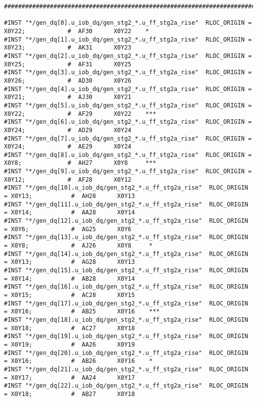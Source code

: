 \begin{verbatim}
################################################################################

#INST "*/gen_dq[0].u_iob_dq/gen_stg2_*.u_ff_stg2a_rise"  RLOC_ORIGIN = X0Y22;            #  AF30      X0Y22    *
#INST "*/gen_dq[1].u_iob_dq/gen_stg2_*.u_ff_stg2a_rise"  RLOC_ORIGIN = X0Y23;            #  AK31      X0Y23    
#INST "*/gen_dq[2].u_iob_dq/gen_stg2_*.u_ff_stg2a_rise"  RLOC_ORIGIN = X0Y25;            #  AF31      X0Y25    
#INST "*/gen_dq[3].u_iob_dq/gen_stg2_*.u_ff_stg2a_rise"  RLOC_ORIGIN = X0Y26;            #  AD30      X0Y26    
#INST "*/gen_dq[4].u_iob_dq/gen_stg2_*.u_ff_stg2a_rise"  RLOC_ORIGIN = X0Y21;            #  AJ30      X0Y21    
#INST "*/gen_dq[5].u_iob_dq/gen_stg2_*.u_ff_stg2a_rise"  RLOC_ORIGIN = X0Y22;            #  AF29      X0Y22    ***
#INST "*/gen_dq[6].u_iob_dq/gen_stg2_*.u_ff_stg2a_rise"  RLOC_ORIGIN = X0Y24;            #  AD29      X0Y24    
#INST "*/gen_dq[7].u_iob_dq/gen_stg2_*.u_ff_stg2a_rise"  RLOC_ORIGIN = X0Y24;            #  AE29      X0Y24    
#INST "*/gen_dq[8].u_iob_dq/gen_stg2_*.u_ff_stg2a_rise"  RLOC_ORIGIN = X0Y8;             #  AH27      X0Y8     ***
#INST "*/gen_dq[9].u_iob_dq/gen_stg2_*.u_ff_stg2a_rise"  RLOC_ORIGIN = X0Y12;            #  AF28      X0Y12    
#INST "*/gen_dq[10].u_iob_dq/gen_stg2_*.u_ff_stg2a_rise"  RLOC_ORIGIN = X0Y13;           #  AH28      X0Y13    
#INST "*/gen_dq[11].u_iob_dq/gen_stg2_*.u_ff_stg2a_rise"  RLOC_ORIGIN = X0Y14;           #  AA28      X0Y14    
#INST "*/gen_dq[12].u_iob_dq/gen_stg2_*.u_ff_stg2a_rise"  RLOC_ORIGIN = X0Y6;            #  AG25      X0Y6     
#INST "*/gen_dq[13].u_iob_dq/gen_stg2_*.u_ff_stg2a_rise"  RLOC_ORIGIN = X0Y8;            #  AJ26      X0Y8     *
#INST "*/gen_dq[14].u_iob_dq/gen_stg2_*.u_ff_stg2a_rise"  RLOC_ORIGIN = X0Y13;           #  AG28      X0Y13    
#INST "*/gen_dq[15].u_iob_dq/gen_stg2_*.u_ff_stg2a_rise"  RLOC_ORIGIN = X0Y14;           #  AB28      X0Y14    
#INST "*/gen_dq[16].u_iob_dq/gen_stg2_*.u_ff_stg2a_rise"  RLOC_ORIGIN = X0Y15;           #  AC28      X0Y15    
#INST "*/gen_dq[17].u_iob_dq/gen_stg2_*.u_ff_stg2a_rise"  RLOC_ORIGIN = X0Y16;           #  AB25      X0Y16    ***
#INST "*/gen_dq[18].u_iob_dq/gen_stg2_*.u_ff_stg2a_rise"  RLOC_ORIGIN = X0Y18;           #  AC27      X0Y18    
#INST "*/gen_dq[19].u_iob_dq/gen_stg2_*.u_ff_stg2a_rise"  RLOC_ORIGIN = X0Y19;           #  AA26      X0Y19    
#INST "*/gen_dq[20].u_iob_dq/gen_stg2_*.u_ff_stg2a_rise"  RLOC_ORIGIN = X0Y16;           #  AB26      X0Y16    *
#INST "*/gen_dq[21].u_iob_dq/gen_stg2_*.u_ff_stg2a_rise"  RLOC_ORIGIN = X0Y17;           #  AA24      X0Y17    
#INST "*/gen_dq[22].u_iob_dq/gen_stg2_*.u_ff_stg2a_rise"  RLOC_ORIGIN = X0Y18;           #  AB27      X0Y18    

\end{verbatim}
